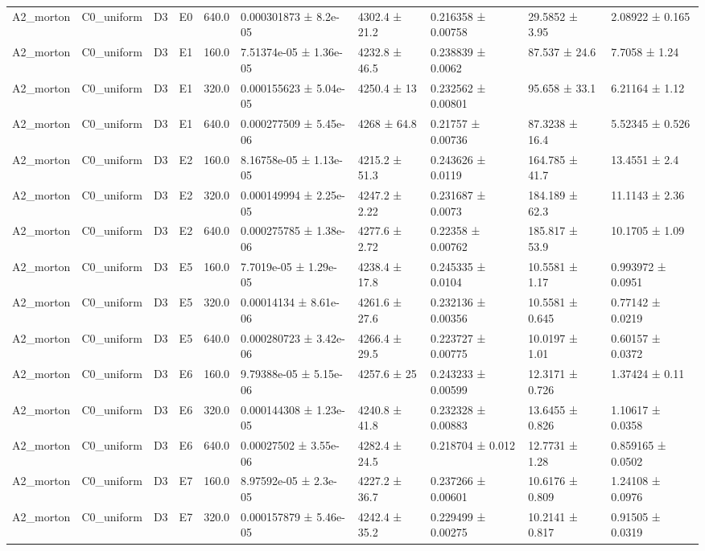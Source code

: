 \begin{table}
\begin{tabular}{llllllllll}
A2\_morton & C0\_uniform & D3 & E0 & 640.0 & 0.000301873 ± 8.2e-05 & 4302.4 ± 21.2 & 0.216358 ± 0.00758 & 29.5852 ± 3.95 & 2.08922 ± 0.165 \\
A2\_morton & C0\_uniform & D3 & E1 & 160.0 & 7.51374e-05 ± 1.36e-05 & 4232.8 ± 46.5 & 0.238839 ± 0.0062 & 87.537 ± 24.6 & 7.7058 ± 1.24 \\
A2\_morton & C0\_uniform & D3 & E1 & 320.0 & 0.000155623 ± 5.04e-05 & 4250.4 ± 13 & 0.232562 ± 0.00801 & 95.658 ± 33.1 & 6.21164 ± 1.12 \\
A2\_morton & C0\_uniform & D3 & E1 & 640.0 & 0.000277509 ± 5.45e-06 & 4268 ± 64.8 & 0.21757 ± 0.00736 & 87.3238 ± 16.4 & 5.52345 ± 0.526 \\
A2\_morton & C0\_uniform & D3 & E2 & 160.0 & 8.16758e-05 ± 1.13e-05 & 4215.2 ± 51.3 & 0.243626 ± 0.0119 & 164.785 ± 41.7 & 13.4551 ± 2.4 \\
A2\_morton & C0\_uniform & D3 & E2 & 320.0 & 0.000149994 ± 2.25e-05 & 4247.2 ± 2.22 & 0.231687 ± 0.0073 & 184.189 ± 62.3 & 11.1143 ± 2.36 \\
A2\_morton & C0\_uniform & D3 & E2 & 640.0 & 0.000275785 ± 1.38e-06 & 4277.6 ± 2.72 & 0.22358 ± 0.00762 & 185.817 ± 53.9 & 10.1705 ± 1.09 \\
A2\_morton & C0\_uniform & D3 & E5 & 160.0 & 7.7019e-05 ± 1.29e-05 & 4238.4 ± 17.8 & 0.245335 ± 0.0104 & 10.5581 ± 1.17 & 0.993972 ± 0.0951 \\
A2\_morton & C0\_uniform & D3 & E5 & 320.0 & 0.00014134 ± 8.61e-06 & 4261.6 ± 27.6 & 0.232136 ± 0.00356 & 10.5581 ± 0.645 & 0.77142 ± 0.0219 \\
A2\_morton & C0\_uniform & D3 & E5 & 640.0 & 0.000280723 ± 3.42e-06 & 4266.4 ± 29.5 & 0.223727 ± 0.00775 & 10.0197 ± 1.01 & 0.60157 ± 0.0372 \\
A2\_morton & C0\_uniform & D3 & E6 & 160.0 & 9.79388e-05 ± 5.15e-06 & 4257.6 ± 25 & 0.243233 ± 0.00599 & 12.3171 ± 0.726 & 1.37424 ± 0.11 \\
A2\_morton & C0\_uniform & D3 & E6 & 320.0 & 0.000144308 ± 1.23e-05 & 4240.8 ± 41.8 & 0.232328 ± 0.00883 & 13.6455 ± 0.826 & 1.10617 ± 0.0358 \\
A2\_morton & C0\_uniform & D3 & E6 & 640.0 & 0.00027502 ± 3.55e-06 & 4282.4 ± 24.5 & 0.218704 ± 0.012 & 12.7731 ± 1.28 & 0.859165 ± 0.0502 \\
A2\_morton & C0\_uniform & D3 & E7 & 160.0 & 8.97592e-05 ± 2.3e-05 & 4227.2 ± 36.7 & 0.237266 ± 0.00601 & 10.6176 ± 0.809 & 1.24108 ± 0.0976 \\
A2\_morton & C0\_uniform & D3 & E7 & 320.0 & 0.000157879 ± 5.46e-05 & 4242.4 ± 35.2 & 0.229499 ± 0.00275 & 10.2141 ± 0.817 & 0.91505 ± 0.0319 \\

\end{tabular}
\end{table}
